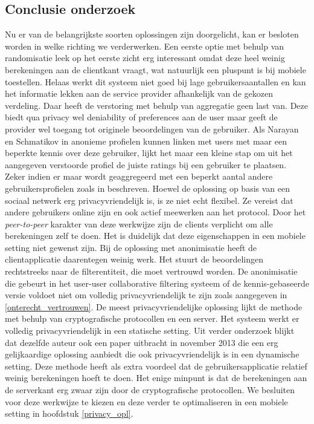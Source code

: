 
\subsection{Conclusie onderzoek}

Nu er van de belangrijkste soorten oplossingen zijn doorgelicht, kan er besloten worden in welke richting we verderwerken. Een eerste optie met behulp van randomisatie leek op het eerste zicht erg interessant omdat deze heel weinig berekeningen aan de clientkant vraagt, wat natuurlijk een pluspunt is bij mobiele toestellen. Helaas werkt dit systeem niet goed bij lage gebruikersaantallen en kan het informatie lekken aan de service provider afhankelijk van de gekozen verdeling. Daar heeft de verstoring met behulp van aggregatie geen last van. Deze biedt qua privacy wel deniability of preferences aan de user maar geeft de provider wel toegang tot originele beoordelingen van de gebruiker. Als Narayan en Schmatikov in \cite{Narayanan2008} anonieme profielen kunnen linken met users met maar een beperkte kennis over deze gebruiker, lijkt het maar een kleine stap om uit het aangegeven verstoorde profiel de juiste ratings bij een gebruiker te plaatsen. Zeker indien er maar wordt geaggregeerd met een beperkt aantal andere gebruikersprofielen zoals in \cite{LCA-CONF-2009-014} beschreven. Hoewel de oplossing op basis van een sociaal netwerk erg privacyvriendelijk is, is ze niet echt flexibel. Ze vereist dat andere gebruikers online zijn en ook actief meewerken aan het protocol. Door het \emph{peer-to-peer} karakter van deze werkwijze zijn de clients verplicht om alle berekeningen zelf te doen. Het is duidelijk dat deze eigenschappen in een mobiele setting niet gewenst zijn.
Bij de oplossing met anonimisatie heeft de clientapplicatie daarentegen weinig werk. Het stuurt de beoordelingen rechtstreeks naar de filterentiteit, die moet vertrouwd worden. De anonimisatie die gebeurt in het user-user collaborative filtering systeem of de kennis-gebaseerde versie voldoet niet om volledig privacyvriendelijk te zijn zoals aangegeven in \ref{onterecht_vertrouwen}. De meest privacyvriendelijke oplossing lijkt de methode met behulp van cryptografische protocollen en een server. Het systeem werkt er volledig privacyvriendelijk in een statische setting. Uit verder onderzoek blijkt dat dezelfde auteur ook een paper uitbracht in november 2013 \cite{ZErkinDyn} die een erg gelijkaardige oplossing aanbiedt die ook privacyvriendelijk is in een dynamische setting. Deze methode heeft als extra voordeel dat de gebruikersapplicatie relatief weinig berekeningen hoeft te doen. Het enige minpunt is dat de berekeningen aan de serverkant erg zwaar zijn door de cryptografische protocollen. We besluiten voor deze werkwijze te kiezen en deze verder te optimaliseren in een mobiele setting in hoofdstuk \ref{privacy_opl}.